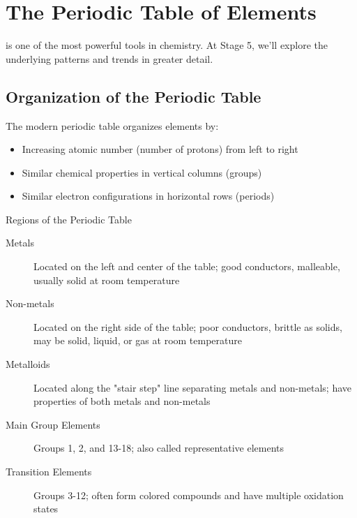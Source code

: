 \section{The Periodic Table of Elements}

 is one of the most powerful tools in chemistry. At Stage 5, we'll explore the underlying patterns and trends in greater detail.

\subsection{Organization of the Periodic Table}

The modern periodic table organizes elements by:

\begin{itemize}
    \item Increasing atomic number (number of protons) from left to right
    \item Similar chemical properties in vertical columns (groups)
    \item Similar electron configurations in horizontal rows (periods)
\end{itemize}

\begin{keyconcept}{Regions of the Periodic Table}
\begin{description}
    \item[Metals] Located on the left and center of the table; good conductors, malleable, usually solid at room temperature
    \item[Non-metals] Located on the right side of the table; poor conductors, brittle as solids, may be solid, liquid, or gas at room temperature
    \item[Metalloids] Located along the "stair step" line separating metals and non-metals; have properties of both metals and non-metals
    \item[Main Group Elements] Groups 1, 2, and 13-18; also called representative elements
    \item[Transition Elements] Groups 3-12; often form colored compounds and have multiple oxidation states
\end{description}
\end{keyconcept}


